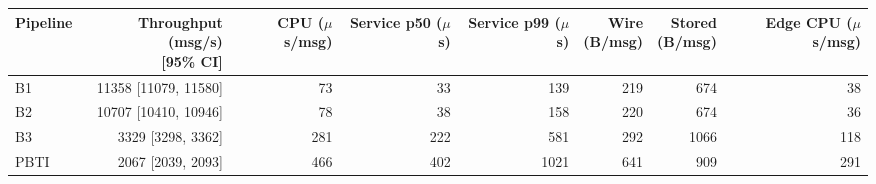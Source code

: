 \begin{tabular}{lrrrrrrr}
\toprule
Pipeline & \makecell[r]{Throughput (msg/s)\\{[95\% CI]}} & \makecell[r]{CPU\\($\mu$s/msg)} & \makecell[r]{Service\\p50 ($\mu$s)} & \makecell[r]{Service\\p99 ($\mu$s)} & \makecell[r]{Wire\\(B/msg)} & \makecell[r]{Stored\\(B/msg)} & \makecell[r]{Edge CPU\\($\mu$s/msg)}\\
\midrule
B1 & 11358 [11079, 11580] & 73 & 33 & 139 & 219 & 674 & 38\\
B2 & 10707 [10410, 10946] & 78 & 38 & 158 & 220 & 674 & 36\\
B3 & 3329 [3298, 3362] & 281 & 222 & 581 & 292 & 1066 & 118\\
PBTI & 2067 [2039, 2093] & 466 & 402 & 1021 & 641 & 909 & 291\\
\bottomrule
\end{tabular}